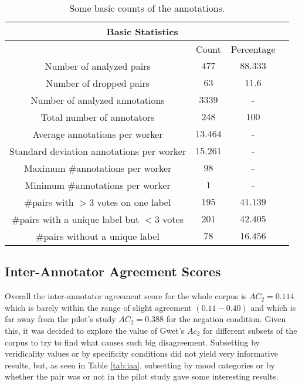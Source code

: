 \begin{table}
\begin{tabular}{|c|c|c|c|}
\hline
\multicolumn{3}{|c|}{Basic Statistics}\\\hline
                      & Count&Percentage\\\hline 
Number of analyzed pairs & $477$ & $88.333$\\\hline
Number of dropped pairs & $63$ & $11.6$\\\hline
Number of analyzed annotations & $3339$ & - \\\hline
Total number of annotators & $248$ & $100$\\\hline
Average annotations per worker & $13.464$ & - \\\hline
Standard deviation annotations per worker & $15.261$ & -\\\hline
Maximum \#annotations per worker & $98$ & - \\\hline
Minimum \#annotations per worker & $1$  & - \\\hline 
\#pairs with $>3$ votes on one label &  $195$ & $41.139$\\\hline
\#pairs with a unique label but $<3$ votes & $201$ & $42.405$ \\\hline                       
\#pairs without a unique label & $78$ & $16.456$\\\hline
\end{tabular}
\caption[Basic counts of the annotations.]{Some basic counts of the annotations.}
\label{tab:basstats}
\end{table}

\subsection{Inter-Annotator Agreement Scores}\label{subsect:iaa}

Overall the inter-annotator agreement score for the whole corpus is $AC_2=0.114$ which is barely within the range of slight agreement $(0.11-0.40)$ \citep{shrout1998measurement} and which is far away from the pilot's study $AC_2=0.388$ for the negation condition. Given this, it was decided to explore the value of Gwet's $Ac_2$ for different subsets of the corpus to try to find what causes such big disagreement. Subsetting by veridicality values or by specificity conditions did not yield very informative results, but, as seen in Table \ref{tab:iaa}, subsetting by mood categories or by whether the pair was or not in the pilot study gave some interesting results.\\

